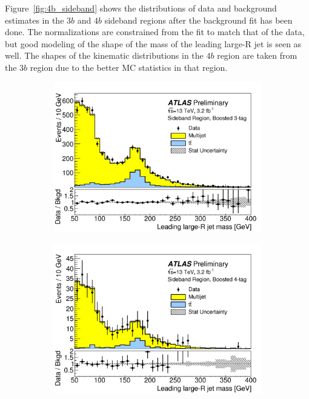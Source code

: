 Figure~\ref{fig:4b_sideband} shows the distributions of data and background estimates in the $3b$ and $4b$ sideband regions after the background fit has been done. The normalizations are constrained from the fit to match that of the data, but good modeling of the shape of the mass of the leading large-R jet is seen as well. The shapes of the kinematic distributions in the $4b$ region are taken from the $3b$ region due to the better MC statistics in that region. 

\begin{figure}[h!]
  \centering
  \captionsetup{justification=centering}

   \begin{subfigure}[t]{0.5\textwidth}
        \centering
        \includegraphics[width=\textwidth]{figures/3b_sideband}
        \caption{}
    \end{subfigure}%
    \begin{subfigure}[t]{0.5\textwidth}
        \centering
        \includegraphics[width=\textwidth]{figures/4b_sideband}
        \caption{}
    \end{subfigure}


\end{figure}
